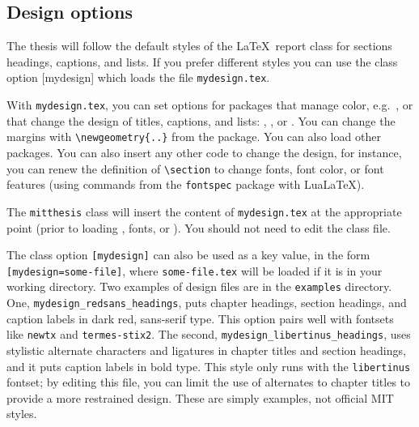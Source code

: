 \documentclass[11pt]{article}
\newcommand*\LuaLaTeX{Lua\LaTeX}
\begin{document}
\subsection{Design options}

The thesis will follow the default styles of the \LaTeX\ report class for sections headings, captions, and lists.  If you prefer different styles you can use the class option [mydesign] which loads the file \texttt{mydesign.tex}.

With \texttt{mydesign.tex}, you can set options for packages that manage color, e.g.\ \texttt{}, or that change the design of titles, captions, and lists: \texttt{}, \texttt{}, or \texttt{}. You can change the margins with \verb|\newgeometry{..}| from the \texttt{} package. You can also load other packages.  You can also insert any other code to change the design, for instance, you can renew the definition of \verb+\section+ to change fonts, font color, or font features (using commands from the \texttt{fontspec} package with \LuaLaTeX).

The \texttt{mitthesis} class will insert the content of \texttt{mydesign.tex} at the appropriate point (prior to loading  \texttt{}, fonts, or \texttt{}). You should not need to edit the class file.

The class option \texttt{[mydesign]} can also be used as a key value, in the form \texttt{[mydesign=some-file]}, where \texttt{some-file.tex} will be loaded if it is in your working directory. Two examples of design files are in the \texttt{examples} directory. One, \verb+mydesign_redsans_headings+, puts chapter headings, section headings, and caption labels in dark red, sans-serif type. This option pairs well with fontsets like \texttt{newtx} and \texttt{termes-stix2}. The second, \verb+mydesign_libertinus_headings+, uses stylistic alternate characters and ligatures in chapter titles and section headings, and it puts caption labels in bold type. This style only runs with the \texttt{libertinus} fontset; by editing this file, you can limit the use of alternates to chapter titles to provide a more restrained design.  These are simply examples, not official MIT styles.
\end{document}
